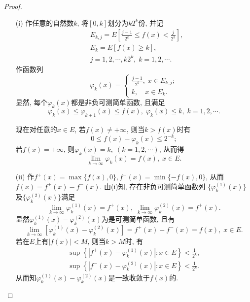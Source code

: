 \begin{proof}
	\begin{enumerate}
		\item[(i)] 
		作任意的自然数$k$, 将$[0,k]$划分为$k 2^k$份, 并记
		$$
		\begin{aligned}
			& E_{k,j} = E \left[ \frac{j-1}{2^k} \leq f(x) < \frac{j}{2^k} \right], \\
			& E_k = E[f(x) \geq k], \\
			& j = 1,2,\cdots,k 2^k,\; k = 1,2,\cdots .
		\end{aligned}
		$$
		作函数列
		$$
			\varphi_k(x) = 
			\begin{cases}
				\frac{j-1}{2^k},\; x \in E_{k,j} ;\\
				k, \quad x \in E_k .
			\end{cases}
		$$
		显然, 每个$\varphi_k(x) $都是非负可测简单函数, 且满足
		$$
			\varphi_k(x) \leq \varphi_{k+1}(x) \leq f(x), \;
			\varphi_k(x) \leq k, \; k=1,2,\cdots.
		$$
		
		现在对任意的$x \in E$, 若$f(x) \neq + \infty$, 则当$k > f(x)$时有
		$$
			0 \leq f(x) - \varphi_k(x) \leq 2^{-k};
		$$
		若$f(x) = + \infty$, 则$\varphi_k(x) = k,\;(k=1,2,\cdots)$, 从而得
		$$
			\lim\limits_{k \to \infty} \varphi_k(x) = f(x), \; x \in E.
		$$
	\end{enumerate}
		
		
		\begin{enumerate}
			\item[(ii)] 
		作$f^+ (x) = \max\{f(x),0\}, f^-(x) = \min\{-f(x),0\}$, 
		从而$f(x) = f^+ (x) - f^-(x)$. 
		由(i)知, 存在非负可测简单函数列
		$\{ \varphi^{(1)}_k (x) \}$及$\{ \varphi^{(2)}_k (x) \}$满足
		$$
			\lim\limits_{k \to \infty} \varphi^{(1)}_k(x) = f^+ (x), \;
			\lim\limits_{k \to \infty} \varphi^{(2)}_k(x) = f^+ (x).
		$$
		显然$\varphi^{(1)}_k (x) - \varphi^{(2)}_k (x)$为是可测简单函数, 且有
		$$
			\lim\limits_{k \to \infty} [\varphi^{(1)}_k (x) - \varphi^{(2)}_k (x)] = f^+ (x) - f^- (x) = f(x), \; x \in E.
		$$
		若在$E$上有$| f(x) | < M$, 则当$k > M$时, 有
		$$
		\begin{aligned}
			\sup \left\{ |f^+ (x) - \varphi^{(1)}_k (x)|: x \in E \right\} < \frac{1}{2^k}, \\
			\sup \left\{ |f^- (x) - \varphi^{(2)}_k (x)|: x \in E \right\} < \frac{1}{2^k}.
		\end{aligned}
		$$
		从而知$\varphi^{(1)}_k (x) - \varphi^{(2)}_k (x)$是一致收敛于$f(x)$的.
		\end{enumerate}
		
\end{proof}


